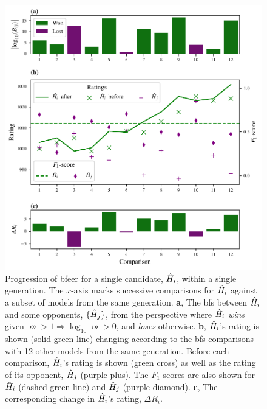 \begin{figure}
    \begin{center}
        \includegraphics{theoretical_study/figures/single_generation_ratings_progression.pdf}
    \end{center}
    \caption[Single model within a single generation of QMLA genetic algorithm]{
        Progression of \acrlong{bfeer} for a single candidate, $\hat{H}_i$, within a single generation.
        The $x$-axis marks successive comparisons for $\hat{H}_i$ against a subset of models from the same generation\footnotemark.
        \textbf{a}, The \glspl{bf} between $\hat{H}_i$ and some opponents, $\{\hat{H}_j\}$, 
            from the perspective where $\hat{H}_i$ \emph{wins} given $\bij > 1 \Rightarrow \log_{10}\bij > 0$, 
            and \emph{loses} otherwise. 
        \textbf{b}, $\hat{H}_i$'s rating is shown (solid green line) changing according to the \glspl{bf} 
            comparisons with 12 other models from the same generation. 
            Before each comparison, $\hat{H}_i$'s rating is shown (green cross)
            as well as the rating of its opponent, $\hat{H}_j$ (purple plus).
            The $F_1$-scores are also shown for $\hat{H}_i$ (dashed green line) and $\hat{H}_j$ (purple diamond).
        \textbf{c}, The corresponding change in $\hat{H}_i$'s rating, $\Delta R_i$. 
        \figtableref
    }
    \label{fig:single_models_elo_ratings}
\end{figure}


